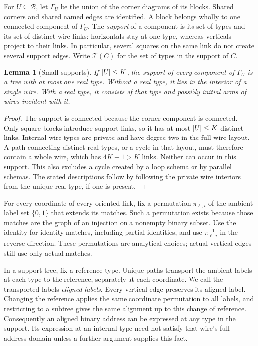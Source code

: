 \documentclass[11pt]{article}
\newtheorem{lemma}[theorem]{Lemma}
\theoremstyle{definition}
\newcommand{\cB}{\mathcal B}
\DeclarePairedDelimiter{\abs}{\lvert}{\rvert}
\begin{document}
For \(U\subseteq\cB\), let \(\Gamma_U\) be the union of the corner
diagrams of its blocks. Shared corners and shared named edges are
identified. A block belongs wholly to one connected component of
\(\Gamma_U\). The \emph{support} of a component is its set of types and
its set of distinct wire links: horizontals stay at one type, whereas
verticals project to their links. In particular, several squares on the
same link do not create several support edges.
Write \(\mathcal T(C)\) for the set of types in the support of \(C\).

\begin{lemma}[Small supports]
\label{offset:lem-support}
If \(\abs{U}\le K\), the support of every component of \(\Gamma_U\) is a
tree with at most one real type. Without a real type, it lies in the
interior of a single wire. With a real type, it consists of that type
and possibly initial arms of wires incident with it.
\end{lemma}

\begin{proof}
The support is connected because the corner component is connected.
Only square blocks introduce support links, so it has at most
\(\abs{U}\le K\) distinct links. Internal wire types are private and have
degree two in the full wire layout. A path connecting distinct real
types, or a cycle in that layout, must therefore contain a whole wire,
which has \(4K+1>K\) links. Neither can occur in this support.
This also excludes a cycle created by a loop schema or by parallel
schemas. The stated descriptions follow by following the private wire
interiors from the unique real type, if one is present.
\end{proof}

For every coordinate of every oriented link, fix a permutation
\(\pi_{\ell,i}\) of the ambient label set \(\{0,1\}\) that extends its
matches. Such a permutation exists because those matches are the graph
of an injection on a nonempty binary subset. Use the identity for
identity matches, including partial identities, and use
\(\pi_{\ell,i}^{-1}\) in the reverse direction. These permutations are
analytical choices; actual vertical edges still use only actual matches.

In a support tree, fix a reference type. Unique paths transport the
ambient labels at each type to the reference, separately at each
coordinate. We call the transported labels \emph{aligned labels}.
Every vertical edge preserves its aligned label. Changing the reference
applies the same coordinate permutation to all labels, and restricting
to a subtree gives the same alignment up to this change of reference.
Consequently an aligned binary address can be expressed at any type in
the support. Its expression at an internal type need not satisfy that
wire's full address domain unless a further argument supplies this fact.
\end{document}
